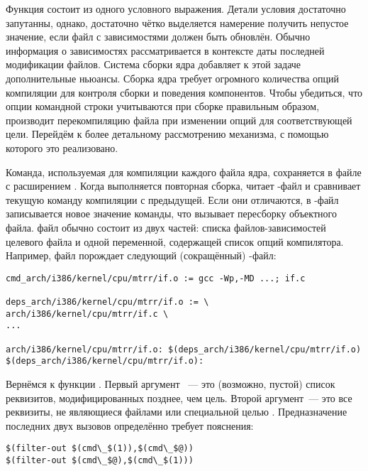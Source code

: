 Функция состоит из одного условного выражения. Детали условия
достаточно запутанны, однако, достаточно чётко выделяется
намерение получить непустое значение, если файл с зависимостями
должен быть обновлён. Обычно информация о зависимостях
рассматривается в контексте даты последней модификации файлов.
Система сборки ядра добавляет к этой задаче дополнительные ньюансы.
Сборка ядра требует огромного количества опций компиляции для
контроля сборки и поведения компонентов. Чтобы убедиться, что
опции командной строки учитываются при сборке правильным образом,
\Makefile{} производит перекомпиляцию файла при изменении опций
для соответствующей цели. Перейдём к более детальному рассмотрению
механизма, с помощью которого это реализовано.

Команда, используемая для компиляции каждого файла ядра, сохраняется в
файле с расширением . Когда выполняется повторная
сборка, \GNUmake{} читает -файл и сравнивает текущую
команду компиляции с предыдущей. Если они отличаются, в
-файл записывается новое значение команды, что вызывает
пересборку объектного файла.  файл обычно состоит из
двух частей: списка файлов-зависимостей целевого файла и одной
переменной, содержащей список опций компилятора. Например, файл
 порождает следующий (сокращённый)
-файл:

\begin{verbatim}
cmd_arch/i386/kernel/cpu/mtrr/if.o := gcc -Wp,-MD ...; if.c

deps_arch/i386/kernel/cpu/mtrr/if.o := \
arch/i386/kernel/cpu/mtrr/if.c \
...

arch/i386/kernel/cpu/mtrr/if.o: $(deps_arch/i386/kernel/cpu/mtrr/if.o)
$(deps_arch/i386/kernel/cpu/mtrr/if.o):
\end{verbatim}

Вернёмся к функции . Первый аргумент
~--- это (возможно, пустой) список реквизитов,
модифицированных позднее, чем цель. Второй аргумент~--- это все
реквизиты, не являющиеся файлами или специальной целью
\target{FORCE}. Предназначение последних двух вызовов
\function{filter-out} определённо требует пояснения:

\begin{verbatim}
$(filter-out $(cmd\_$(1)),$(cmd\_$@))
$(filter-out $(cmd\_$@),$(cmd\_$(1)))
\end{verbatim}

